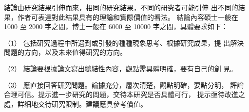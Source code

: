 結論由研究結果引伸而來，相同的研究結果，不同的研究者可能引伸
出不同的結果，作者可表達對此結果具有的理論和實際價值的看法。
結論內容碩士一般在 1000 至 2000 字之間，博士一般在 6000 至
10000 字之間，具體要求如下：

（1） 包括研究過程中所遇到或引發的種種現象思考、根據研究成果，提
出解決問題的方向，以及未來值得研究的方向。

（2） 結論要根據論文寫出總結性內容，觀點需具體明確，要有自己的創
見。

（3） 應直接回答研究問題。論據充分，層次清楚，觀點明確，要點分明，
評論合理可信。提示進一步研究的問題，交待本研究是否具體可行，
提示亟待改進之處，詳細地交待研究限制。建議應具參考價值。
